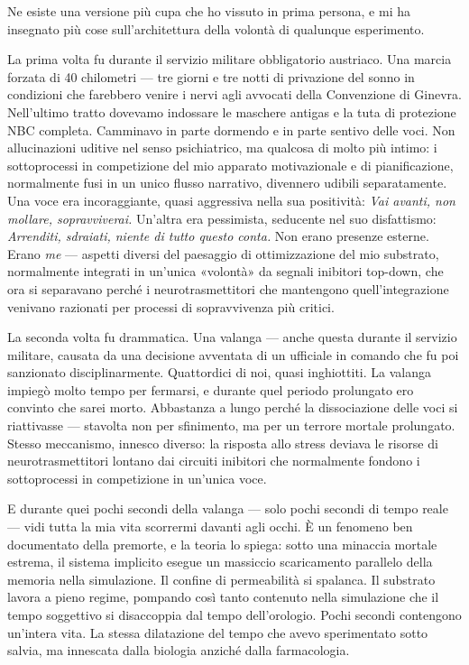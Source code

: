 \documentclass[11pt, twoside, openright]{book}
\begin{document}
Ne esiste una versione più cupa che ho vissuto in prima persona, e mi ha insegnato più cose sull'architettura della volontà di qualunque esperimento.

La prima volta fu durante il servizio militare obbligatorio austriaco. Una marcia forzata di 40 chilometri --- tre giorni e tre notti di privazione del sonno in condizioni che farebbero venire i nervi agli avvocati della Convenzione di Ginevra. Nell'ultimo tratto dovevamo indossare le maschere antigas e la tuta di protezione NBC completa. Camminavo in parte dormendo e in parte sentivo delle voci. Non allucinazioni uditive nel senso psichiatrico, ma qualcosa di molto più intimo: i sottoprocessi in competizione del mio apparato motivazionale e di pianificazione, normalmente fusi in un unico flusso narrativo, divennero udibili separatamente. Una voce era incoraggiante, quasi aggressiva nella sua positività: \textit{Vai avanti, non mollare, sopravviverai.} Un'altra era pessimista, seducente nel suo disfattismo: \textit{Arrenditi, sdraiati, niente di tutto questo conta.} Non erano presenze esterne. Erano \textit{me} --- aspetti diversi del paesaggio di ottimizzazione del mio substrato, normalmente integrati in un'unica «volontà» da segnali inibitori top-down, che ora si separavano perché i neurotrasmettitori che mantengono quell'integrazione venivano razionati per processi di sopravvivenza più critici.

La seconda volta fu drammatica. Una valanga --- anche questa durante il servizio militare, causata da una decisione avventata di un ufficiale in comando che fu poi sanzionato disciplinarmente. Quattordici di noi, quasi inghiottiti. La valanga impiegò molto tempo per fermarsi, e durante quel periodo prolungato ero convinto che sarei morto. Abbastanza a lungo perché la dissociazione delle voci si riattivasse --- stavolta non per sfinimento, ma per un terrore mortale prolungato. Stesso meccanismo, innesco diverso: la risposta allo stress deviava le risorse di neurotrasmettitori lontano dai circuiti inibitori che normalmente fondono i sottoprocessi in competizione in un'unica voce.

E durante quei pochi secondi della valanga --- solo pochi secondi di tempo reale --- vidi tutta la mia vita scorrermi davanti agli occhi. È un fenomeno ben documentato della premorte, e la teoria lo spiega: sotto una minaccia mortale estrema, il sistema implicito esegue un massiccio scaricamento parallelo della memoria nella simulazione. Il confine di permeabilità si spalanca. Il substrato lavora a pieno regime, pompando così tanto contenuto nella simulazione che il tempo soggettivo si disaccoppia dal tempo dell'orologio. Pochi secondi contengono un'intera vita. La stessa dilatazione del tempo che avevo sperimentato sotto salvia, ma innescata dalla biologia anziché dalla farmacologia.
\end{document}

